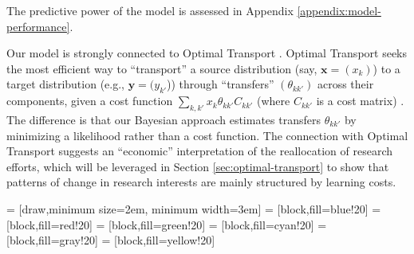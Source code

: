 \documentclass{article}
\begin{document}
The predictive power of the model is assessed in Appendix \ref{appendix:model-performance}. %

Our model is strongly connected to Optimal Transport \citep{muzellec2017tsallis,li2019learning}. Optimal Transport seeks the most efficient way to  ``transport'' a source distribution (say, $\bm{x}=(x_k)$) to a target distribution (e.g., $\bm{y}=(y_{k'}$)) through ``transfers'' $(\theta_{kk'})$ across their components, given a cost function $\sum_{k,k'} x_{k} \theta_{kk'}C_{kk'}$ (where $C_{kk'}$ is a cost matrix) \citep{Peyr2019}. The difference is that our Bayesian approach estimates transfers $\theta_{kk'}$ by minimizing a likelihood rather than a cost function. The connection with Optimal Transport suggests an ``economic'' interpretation of the reallocation of research efforts, which will be leveraged in Section \ref{sec:optimal-transport} to show that patterns of change in research interests are mainly structured by learning costs. %


     = [draw,minimum size=2em, minimum width=3em]
     = [block,fill=blue!20]
     = [block,fill=red!20]
     = [block,fill=green!20]
     = [block,fill=cyan!20]
     = [block,fill=gray!20]
     = [block,fill=yellow!20]
    
\end{document}

